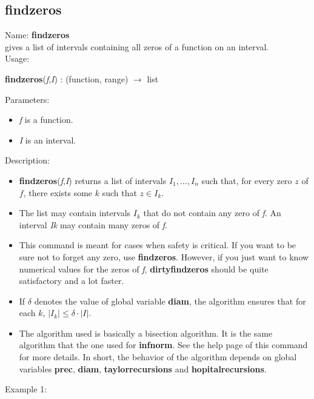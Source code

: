 \subsection{findzeros}
\label{labfindzeros}
\noindent Name: \textbf{findzeros}\\
gives a list of intervals containing all zeros of a function on an interval.\\
\noindent Usage: 
\begin{center}
\textbf{findzeros}(\emph{f},\emph{I}) : (\textsf{function}, \textsf{range}) $\rightarrow$ \textsf{list}\\
\end{center}
Parameters: 
\begin{itemize}
\item \emph{f} is a function.
\item \emph{I} is an interval.
\end{itemize}
\noindent Description: \begin{itemize}

\item \textbf{findzeros}(\emph{f},\emph{I}) returns a list of intervals $I_1, \dots, I_n$ such that, for 
   every zero $z$ of $f$, there exists some $k$ such that $z \in I_k$.

\item The list may contain intervals $I_k$ that do not contain any zero of \emph{f}.
   An interval \emph{Ik} may contain many zeros of \emph{f}.

\item This command is meant for cases when safety is critical. If you want to be sure
   not to forget any zero, use \textbf{findzeros}. However, if you just want to know 
   numerical values for the zeros of \emph{f}, \textbf{dirtyfindzeros} should be quite 
   satisfactory and a lot faster.

\item If $\delta$ denotes the value of global variable \textbf{diam}, the algorithm ensures
   that for each $k$, $|I_k| \le \delta \cdot |I|$.

\item The algorithm used is basically a bisection algorithm. It is the same algorithm
   that the one used for \textbf{infnorm}. See the help page of this command for more 
   details. In short, the behavior of the algorithm depends on global variables
   \textbf{prec}, \textbf{diam}, \textbf{taylorrecursions} and \textbf{hopitalrecursions}.
\end{itemize}
\noindent Example 1: 
